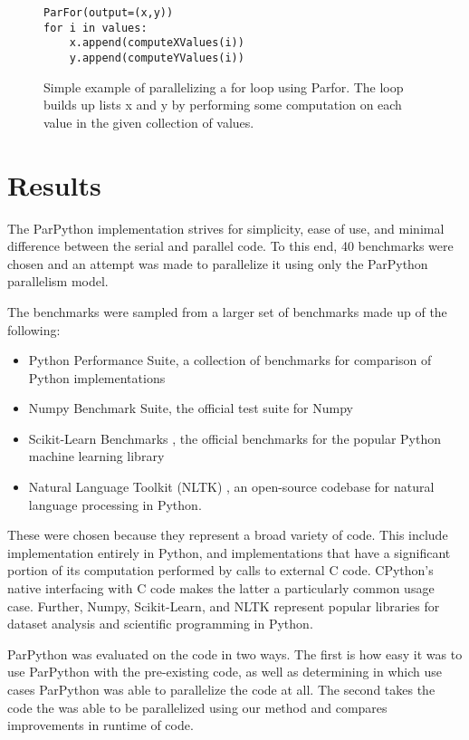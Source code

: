 \documentclass[conference]{IEEEtran}
\begin{document}
\begin{figure}[t]
\begin{lstlisting}[frame=single]
ParFor(output=(x,y))
for i in values:
    x.append(computeXValues(i))
    y.append(computeYValues(i))
\end{lstlisting}
\caption{Simple example of parallelizing a for loop using Parfor. The loop builds up lists x and y by performing some computation on each value in the given collection of values.}
\label{basicExample}
\end{figure}

\section{Results}

The ParPython implementation strives for simplicity, ease of use, and minimal difference between the serial and parallel code.
To this end, 40 benchmarks were chosen and an attempt was made to parallelize it using only the ParPython parallelism model.

The benchmarks were sampled from a larger set of benchmarks made up of the following:
\begin{itemize}
   \item Python Performance Suite\cite{pyPerformance}, a collection of benchmarks for comparison of Python implementations
   \item Numpy Benchmark Suite\cite{numpyPerformance}, the official test suite for Numpy 
   \item Scikit-Learn Benchmarks \cite{scikit-learn}, the official benchmarks for the popular Python machine learning library
   \item Natural Language Toolkit (NLTK) \cite{bird_2016}, an 
   open-source codebase for natural language processing in Python.
\end{itemize}
These were chosen because they represent a broad variety of code. 
This include implementation entirely in Python, and implementations 
that have a significant portion of its computation performed by calls to external C code.
CPython's native interfacing with C code makes the latter a particularly common usage case.
Further, Numpy, Scikit-Learn, and NLTK represent popular libraries for dataset analysis and scientific programming in Python.


ParPython was evaluated on the code in two ways. The first is how
easy it was to use ParPython with the pre-existing code, as well as 
determining in which use cases ParPython was able to 
parallelize the code at all.
The second takes the code the was able to be parallelized using our method and compares improvements in runtime of code.
\end{document}
